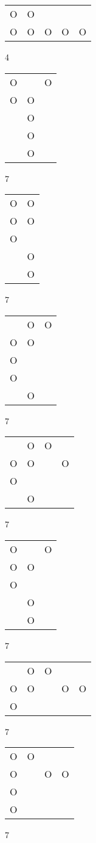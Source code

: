 \begin{tabular}{|m{0.2cm}m{0.2cm}m{0.2cm}m{0.2cm}m{0.2cm}|}\hline
O&O& & & \\
O&O&O&O&O\\
\hline\end{tabular}4
\begin{tabular}{|m{0.2cm}m{0.2cm}m{0.2cm}|}\hline
O& &O\\
O&O& \\
 &O& \\
 &O& \\
 &O& \\
\hline\end{tabular}7
\begin{tabular}{|m{0.2cm}m{0.2cm}|}\hline
O&O\\
O&O\\
O& \\
 &O\\
 &O\\
\hline\end{tabular}7
\begin{tabular}{|m{0.2cm}m{0.2cm}m{0.2cm}|}\hline
 &O&O\\
O&O& \\
O& & \\
O& & \\
 &O& \\
\hline\end{tabular}7
\begin{tabular}{|m{0.2cm}m{0.2cm}m{0.2cm}m{0.2cm}|}\hline
 &O&O& \\
O&O& &O\\
O& & & \\
 &O& & \\
\hline\end{tabular}7
\begin{tabular}{|m{0.2cm}m{0.2cm}m{0.2cm}|}\hline
O& &O\\
O&O& \\
O& & \\
 &O& \\
 &O& \\
\hline\end{tabular}7
\begin{tabular}{|m{0.2cm}m{0.2cm}m{0.2cm}m{0.2cm}m{0.2cm}|}\hline
 &O&O& & \\
O&O& &O&O\\
O& & & & \\
\hline\end{tabular}7
\begin{tabular}{|m{0.2cm}m{0.2cm}m{0.2cm}m{0.2cm}|}\hline
O&O& & \\
O& &O&O\\
O& & & \\
O& & & \\
\hline\end{tabular}7
